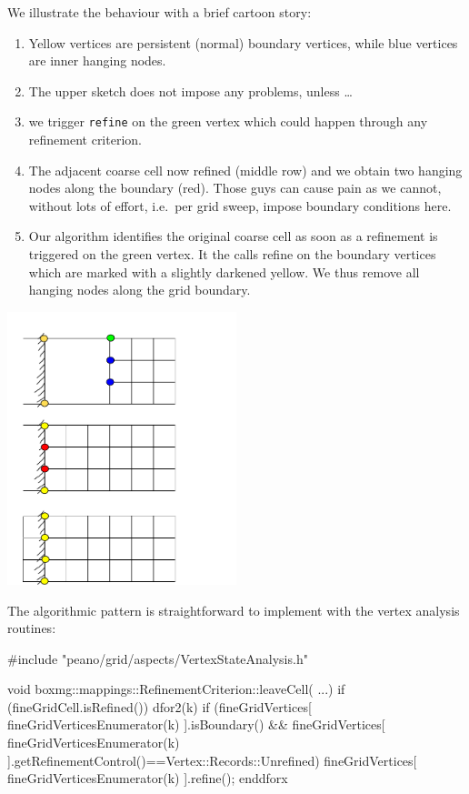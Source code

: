 \noindent
We illustrate the behaviour with a brief cartoon story:
\begin{enumerate}
  \item Yellow vertices are persistent (normal) boundary vertices, while blue
  vertices are inner hanging nodes.
  \item The upper sketch does not impose any problems, unless \ldots
  \item we trigger \texttt{refine} on the green vertex which could happen
  through any refinement criterion.
  \item The adjacent coarse cell now refined (middle row) and we obtain two
  hanging nodes along the boundary (red). Those guys can cause pain as we
  cannot, without lots of effort, i.e.~per grid sweep, impose boundary
  conditions here.
  \item Our algorithm identifies the original coarse cell as soon as a
  refinement is triggered on the green vertex. It the calls refine on the
  boundary vertices which are marked with a slightly darkened yellow. We thus
  remove all hanging nodes along the grid boundary.
\end{enumerate}

\begin{center}
  \includegraphics[width=0.5\textwidth]{98_patterns/boundaries-without-hanging-nodes.pdf}
\end{center}

\noindent
The algorithmic pattern is straightforward to implement with the vertex analysis
routines:
\begin{code}
#include "peano/grid/aspects/VertexStateAnalysis.h"

void boxmg::mappings::RefinementCriterion::leaveCell( ...) {
  if (fineGridCell.isRefined()) {
    dfor2(k)
      if (fineGridVertices[ fineGridVerticesEnumerator(k) ].isBoundary() &&
          fineGridVertices[ fineGridVerticesEnumerator(k) ].getRefinementControl()==Vertex::Records::Unrefined) {
        fineGridVertices[ fineGridVerticesEnumerator(k) ].refine();
      }
    enddforx
  }
}
\end{code}
